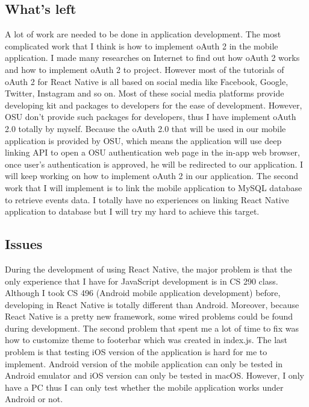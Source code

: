 \documentclass[letterpaper, 10pt,titlepage]{article}
\begin{document}
\subsection{What's left}
A lot of work are needed to be done in application development. The most complicated work that I think is how to implement oAuth 2 in the mobile application. I made many researches on Internet to find out how oAuth 2 works and how to implement oAuth 2 to project. However most of the tutorials of oAuth 2 for React Native is all based on social media like Facebook, Google, Twitter, Instagram and so on. Most of these social media platforms provide developing kit and packages to developers for the ease of development. However, OSU don’t provide such packages for developers, thus I have implement oAuth 2.0 totally by myself. Because the oAuth 2.0 that will be used in our mobile application is provided by OSU, which means the application will use deep linking API to open a OSU authentication web page in the in-app web browser, once user’s authentication is approved, he will be redirected to our application. I will keep working on how to implement oAuth 2 in our application. The second work that I will implement is to link the mobile application to MySQL database to retrieve events data. I totally have no experiences on linking React Native application to database but I will try my hard to achieve this target. 

\subsection{Issues}
During the development of using React Native, the major problem is that the only experience that I have for JavaScript development is in CS 290 class. Although I took CS 496 (Android mobile application development) before, developing in React Native is totally different than Android. Moreover, because React Native is a pretty new framework, some wired problems could be found during development. The second problem that spent me a lot of time to fix was how to customize theme to footerbar which was created in index.js. The last problem is that testing iOS version of the application is hard for me to implement. Android version of the mobile application can only be tested in Android emulator and iOS version can only be tested in macOS. However, I only have a PC thus I can only test whether the mobile application works under Android or not.
\end{document}
